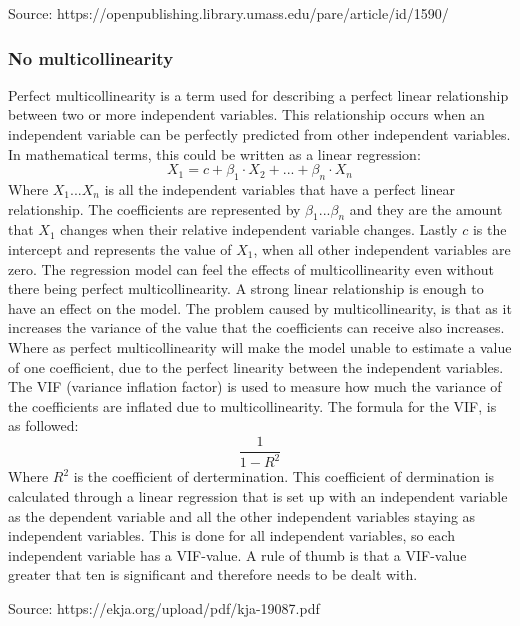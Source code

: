 Source: https://openpublishing.library.umass.edu/pare/article/id/1590/

\subsubsection{No multicollinearity}
Perfect multicollinearity is a term used for describing a perfect linear relationship between two or more independent variables. This relationship occurs when an independent variable can be perfectly predicted from other independent variables. In mathematical terms, this could be written as a linear regression:
$$
X_1 = c+\beta_1\cdot X_2+...+\beta_n\cdot X_n
$$ 
Where $X_1...X_n$ is all the independent variables that have a perfect linear relationship. The coefficients are represented by $\beta_1...\beta_n$ and they are the amount that $X_1$ changes when their relative independent variable changes.
Lastly $c$ is the intercept and represents the value of $X_1$, when all other independent variables are zero.
\newline
The regression model can feel the effects of multicollinearity even without there being perfect multicollinearity. A strong linear relationship is enough to have an effect on the model. The problem caused by multicollinearity, is that as it increases the variance of the value that the coefficients can receive also increases. Where as perfect multicollinearity will make the model unable to estimate a value of one coefficient, due to the perfect linearity between the independent variables.
\newline
The VIF (variance inflation factor) is used to measure how much the variance of the coefficients are inflated due to multicollinearity. The formula for the VIF, is as followed:
$$
\frac{1}{1-R^2}
$$
Where $R^2$ is the coefficient of dertermination. This coefficient of dermination is calculated through a linear regression that is set up with an independent variable as the dependent variable and all the other independent variables staying as independent variables. This is done for all independent variables, so each independent variable has a VIF-value. A rule of thumb is that a VIF-value greater that ten is significant and therefore needs to be dealt with.


Source: https://ekja.org/upload/pdf/kja-19087.pdf